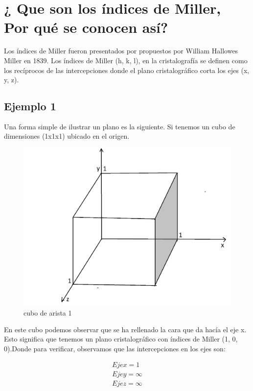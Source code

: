 \documentclass[12pt,a4paper]{article}
\begin{document}
\section{¿ Que son los índices de Miller, Por qué se conocen así?}

Los índices de Miller fueron presentados por propuestos por William Hallowes Miller en 1839. Los índices de Miller (h, k, l), en la cristalografía se definen como los recíprocos de las intercepciones donde el plano cristalográfico corta los ejes (x, y, z).

\subsection{Ejemplo 1}
Una forma simple de ilustrar un plano es la siguiente. Si tenemos un cubo de dimensiones (1x1x1) ubicado en el origen.

\begin{figure}[H]
	\centering
		\includegraphics[scale=0.5]{4.png}
		\caption{cubo de arista 1}
\end{figure}


En este cubo podemos observar que se ha rellenado la cara que da hacía el eje x. Esto significa que tenemos un plano cristalográfico con índices de Miller (1, 0, 0).Donde para verificar, observamos que las intercepciones en los ejes son:

\begin{align*}
    Eje x = 1 \\
    Eje y = \infty \\
    Eje z = \infty \\
\end{align*}
    
\end{document}
